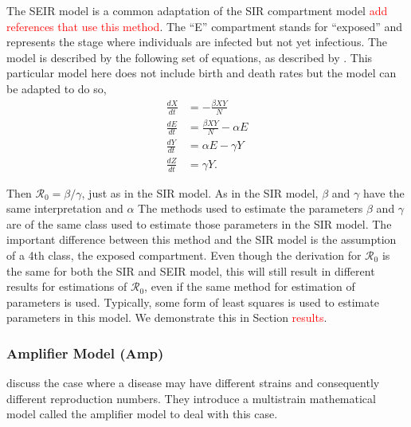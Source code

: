 \documentclass[12pt]{article}
\newcommand{\com}[1]{\textcolor{red}{ #1}}
\newcommand{\rr}{\ensuremath{\mathcal{R}_0}}
\begin{document}
The SEIR model is a common adaptation of the SIR compartment model \com{add references that use this method}.  The ``E'' compartment stands for ``exposed'' and represents the stage where individuals are infected but not yet infectious.  The model is described by the following set of equations, as described by \cite{cintronarias2009}.  This particular model here does not include birth and death rates but the model can be adapted to do so,
\begin{align*}
  \frac{dX}{dt} &= - \frac{\beta XY}{N} \\
  \frac{dE}{dt} &= \frac{\beta XY}{N}  - \alpha E\\
  \frac{dY}{dt} &= \alpha E - \gamma Y \\
  \frac{dZ}{dt} &= \gamma Y.
\end{align*}

Then $\rr = \beta / \gamma$, just as in the SIR model.  As in the SIR model, $\beta$ and $\gamma$ have the same interpretation and $\alpha$  The methods used to estimate the parameters $\beta$ and $\gamma$ are of the same class used to estimate those parameters in the SIR model.  The important difference between this method and the SIR model is the assumption of a 4th class, the exposed compartment.  Even though the derivation for $\rr$ is the same for both the SIR and SEIR model, this will still result in different results for estimations of \rr, even if the same method for estimation of parameters is used.  Typically, some form of least squares is used to estimate parameters in this model. We demonstrate this in Section \com{results}.





\subsubsection{Amplifier Model (Amp)}
\cite{blower2004} discuss the case where a disease may have different strains and consequently different reproduction numbers.  They introduce a multistrain mathematical model called the amplifier model to deal with this case.
\end{document}
